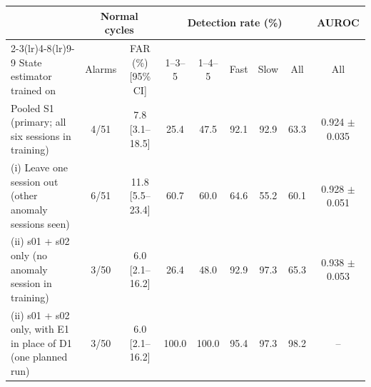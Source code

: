 \begin{tabular}{@{}lcccccccc@{}}
\toprule
 & \multicolumn{2}{c}{Normal cycles} & \multicolumn{5}{c}{Detection rate (\%)} & AUROC \\
\cmidrule(lr){2-3}\cmidrule(lr){4-8}\cmidrule(lr){9-9}
State estimator trained on & Alarms & FAR (\%) [95\% CI] & 1--3--5 & 1--4--5 & Fast & Slow & All & All \\
\midrule
Pooled S1 (primary; all six sessions in training) & 4/51 & 7.8 [3.1--18.5] & 25.4 & 47.5 & 92.1 & 92.9 & 63.3 & 0.924 $\pm$ 0.035 \\ %
(i) Leave one session out (other anomaly sessions seen) & 6/51 & 11.8 [5.5--23.4] & 60.7 & 60.0 & 64.6 & 55.2 & 60.1 & 0.928 $\pm$ 0.051 \\ %
(ii) s01 + s02 only (no anomaly session in training) & 3/50 & 6.0 [2.1--16.2] & 26.4 & 48.0 & 92.9 & 97.3 & 65.3 & 0.938 $\pm$ 0.053 \\ %
(ii) s01 + s02 only, with E1 in place of D1 (one planned run) & 3/50 & 6.0 [2.1--16.2] & 100.0 & 100.0 & 95.4 & 97.3 & 98.2 & -- \\ %
\bottomrule
\end{tabular}
